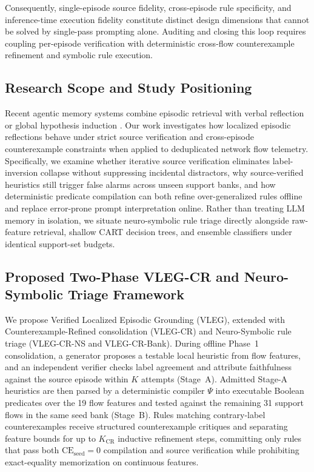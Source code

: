 \documentclass[11pt,letterpaper,onecolumn]{article}
\begin{document}
Consequently, single-episode source fidelity, cross-episode rule specificity, and inference-time execution fidelity constitute distinct design dimensions that cannot be solved by single-pass prompting alone. Auditing and closing this loop requires coupling per-episode verification with deterministic cross-flow counterexample refinement and symbolic rule execution.

\subsection{Research Scope and Study Positioning}
Recent agentic memory systems combine episodic retrieval with verbal reflection or global hypothesis induction \cite{wu2025from,zhang2025survey,shinn2023reflexion,wang2024voyager,agarwal2026hypothesis,he2024idea}. Our work investigates how localized episodic reflections behave under strict source verification and cross-episode counterexample constraints when applied to deduplicated network flow telemetry. Specifically, we examine whether iterative source verification eliminates label-inversion collapse without suppressing incidental distractors, why source-verified heuristics still trigger false alarms across unseen support banks, and how deterministic predicate compilation can both refine over-generalized rules offline and replace error-prone prompt interpretation online. Rather than treating LLM memory in isolation, we situate neuro-symbolic rule triage directly alongside raw-feature retrieval, shallow CART decision trees, and ensemble classifiers under identical support-set budgets.

\subsection{Proposed Two-Phase VLEG-CR and Neuro-Symbolic Triage Framework}
We propose Verified Localized Episodic Grounding (VLEG), extended with Counterexample-Refined consolidation (VLEG-CR) and Neuro-Symbolic rule triage (VLEG-CR-NS and VLEG-CR-Bank). During offline Phase~1 consolidation, a generator proposes a testable local heuristic from flow features, and an independent verifier checks label agreement and attribute faithfulness against the source episode within $K$ attempts (Stage~A). Admitted Stage-A heuristics are then parsed by a deterministic compiler $\Psi$ into executable Boolean predicates over the 19 flow features and tested against the remaining 31 support flows in the same seed bank (Stage~B). Rules matching contrary-label counterexamples receive structured counterexample critiques and separating feature bounds for up to $K_{\mathrm{CR}}$ inductive refinement steps, committing only rules that pass both $\mathrm{CE}_{\mathrm{seed}}=0$ compilation and source verification while prohibiting exact-equality memorization on continuous features.
\end{document}
